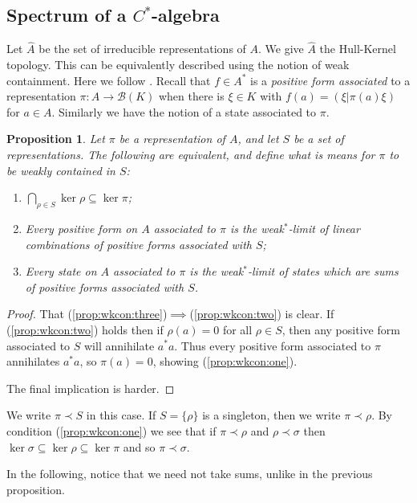 \documentclass[a4paper,11pt]{article}
\newcommand{\mc}[1]{{\mathcal{#1}}}
\newtheorem{proposition}[lemma]{Proposition}
\begin{document}
\subsection{Spectrum of a $C^*$-algebra}

Let $\hat A$ be the set of irreducible representations of $A$.  We give
$\hat A$ the Hull-Kernel topology.  This can be equivalently described using
the notion of weak containment.  Here we follow \cite[Chapter~3.4]{dix}.
Recall that $f\in A^*$ is a \emph{positive form associated} to a representation
$\pi:A\rightarrow\mc B(K)$ when there is $\xi\in K$ with
$f(a) = (\xi|\pi(a)\xi)$ for $a\in A$.  Similarly we have the notion of
a state associated to $\pi$.

\begin{proposition}\label{prop:wkcon}
Let $\pi$ be a representation of $A$, and let $S$ be a set of representations.
The following are equivalent, and define what is means for $\pi$ to be
\emph{weakly contained} in $S$:
\begin{enumerate}
\item\label{prop:wkcon:one}
$\bigcap_{\rho\in S} \ker\rho \subseteq \ker\pi$;
\item\label{prop:wkcon:two}
Every positive form on $A$ associated to $\pi$ is the weak$^*$-limit
of linear combinations of positive forms associated with $S$;
\item\label{prop:wkcon:three}
Every state on $A$ associated to $\pi$ is the weak$^*$-limit
of states which are sums of positive forms associated with $S$.
\end{enumerate}
\end{proposition}
\begin{proof}
That (\ref{prop:wkcon:three})$\implies$(\ref{prop:wkcon:two}) is clear.
If (\ref{prop:wkcon:two}) holds then if $\rho(a)=0$ for all $\rho\in S$,
then any positive form associated to $S$ will annihilate $a^*a$.
Thus every positive form associated to $\pi$ annihilates $a^*a$, so
$\pi(a)=0$, showing (\ref{prop:wkcon:one}).

The final implication is harder.
\end{proof}

We write $\pi \prec S$ in this case.  If $S=\{\rho\}$ is a singleton, then we
write $\pi\prec\rho$.  By condition (\ref{prop:wkcon:one}) we see that if
$\pi\prec\rho$ and $\rho\prec\sigma$ then $\ker\sigma \subseteq \ker\rho
\subseteq\ker\pi$ and so $\pi\prec\sigma$.

In the following, notice that we need not take sums, unlike in the previous
proposition.
\end{document}
